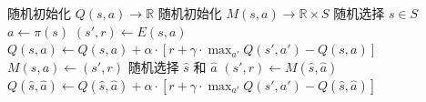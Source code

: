 \begin{algorithmic}
         \State 随机初始化 $Q(s,a) \rightarrow \mathbb{R}$
            \State 随机初始化 $M(s,a) \rightarrow \mathbb{R}\times S$ 
            \Repeat
                \State 随机选择 $s \in S$
                \State $a \gets \pi(s)$ 
                \State $(s',r) \gets E(s, a)$ 
                \State $Q(s, a) \gets  Q(s, a) + \alpha \cdot [r +
                \gamma \cdot \max_{a'} Q(s', a') - Q(s,a)]$
                \State $M(s, a) \gets (s', r)$
                    \State 随机选择 $\hat{s}$ 和 $\hat{a}$
                    \State $(s', r) \gets M(\hat{s}, \hat{a})$
                    \State $Q(\hat{s}, \hat{a}) \gets  Q(\hat{s}, \hat{a}) + \alpha \cdot [r + \gamma \cdot \max_{a'} Q(s', a')-Q(\hat{s},\hat{a})]$
                \EndFor
        \end{algorithmic}
